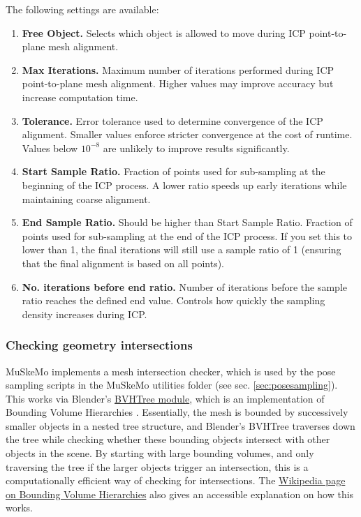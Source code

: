 \documentclass{article}
\begin{document}
The following settings are available:


\begin{enumerate}
    \item \textbf{Free Object.} Selects which object is allowed to move during ICP point-to-plane mesh alignment.
    
    \item \textbf{Max Iterations.} Maximum number of iterations performed during ICP point-to-plane mesh alignment. Higher values may improve accuracy but increase computation time.
    
    \item \textbf{Tolerance.} Error tolerance used to determine convergence of the ICP alignment. Smaller values enforce stricter convergence at the cost of runtime. Values below $10^{-8}$ are unlikely to improve results significantly.
    
    \item \textbf{Start Sample Ratio.} Fraction of points used for sub-sampling at the beginning of the ICP process. A lower ratio speeds up early iterations while maintaining coarse alignment.
    
    \item \textbf{End Sample Ratio.} Should be higher than Start Sample Ratio. Fraction of points used for sub-sampling at the end of the ICP process. If you set this to lower than 1, the final iterations will still use a sample ratio of 1 (ensuring that the final alignment is based on all points).
    
    \item \textbf{No. iterations before end ratio.} Number of iterations before the sample ratio reaches the defined end value. Controls how quickly the sampling density increases during ICP.
\end{enumerate}


\subsubsection{Checking geometry intersections}
\label{sec:intersectionchecker}

MuSkeMo implements a mesh intersection checker, which is used by the pose sampling scripts in the MuSkeMo utilities folder (see sec. \ref{sec:posesampling}). This works via Blender's \href{https://docs.blender.org/api/current/mathutils.bvhtree.html}{BVHTree module}, which is an implementation of Bounding Volume Hierarchies \cite{ericsonBoundingVolumeHierarchies2005}. Essentially, the mesh is bounded by successively smaller objects in a nested tree structure, and Blender's BVHTree traverses down the tree while checking whether these bounding objects intersect with other objects in the scene. By starting with large bounding volumes, and only traversing the tree if the larger objects trigger an intersection, this is a computationally efficient way of checking for intersections. The \href{https://en.wikipedia.org/wiki/Bounding_volume_hierarchy}{Wikipedia page on Bounding Volume Hierarchies} also gives an accessible explanation on how this works.
\end{document}
